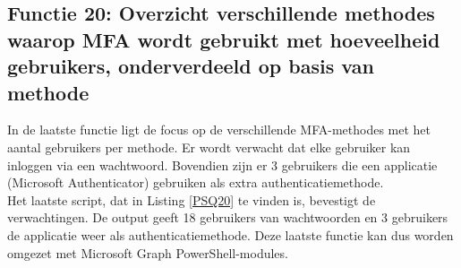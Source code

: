 \subsection{Functie 20: Overzicht verschillende methodes waarop MFA wordt gebruikt met hoeveelheid gebruikers, onderverdeeld op basis van methode}

In de laatste functie ligt de focus op de verschillende \ac{MFA}-methodes met het aantal gebruikers per methode. Er wordt verwacht dat elke gebruiker kan inloggen via een wachtwoord. Bovendien zijn er 3 gebruikers die een applicatie (Microsoft Authenticator) gebruiken als extra authenticatiemethode. \\

Het laatste script, dat in Listing \ref{PSQ20} te vinden is, bevestigt de verwachtingen. De output geeft 18 gebruikers van wachtwoorden en 3 gebruikers de applicatie weer als authenticatiemethode. Deze laatste functie kan dus worden omgezet met 
Microsoft Graph PowerShell-modules.